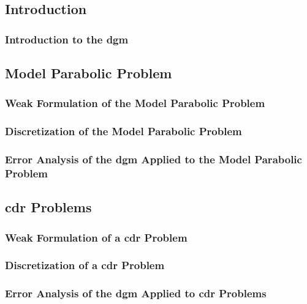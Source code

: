 \subsection{Introduction}

\begin{frame}
    \frametitle{Introduction to the \acrfull{dgm}}

    
\end{frame}

\subsection{Model Parabolic Problem}

\begin{frame}
    \frametitle{Weak Formulation of the Model Parabolic Problem}

    
\end{frame}

\begin{frame}
    \frametitle{Discretization of the Model Parabolic Problem}

    
\end{frame}

\begin{frame}
    \frametitle{Error Analysis of the \acrshort{dgm} Applied to the Model Parabolic Problem}

    
\end{frame}

\subsection{\texorpdfstring{\acrlong{cdr}}{} Problems}

\begin{frame}
    \frametitle{Weak Formulation of a \acrfull{cdr} Problem}

    
\end{frame}

\begin{frame}
    \frametitle{Discretization of a \acrshort{cdr} Problem}

    
\end{frame}

\begin{frame}
    \frametitle{Error Analysis of the \acrshort{dgm} Applied to \acrshort{cdr} Problems}

    
\end{frame}